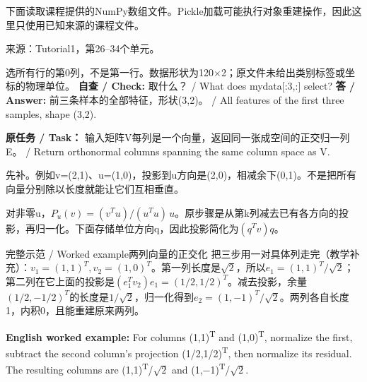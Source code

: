 下面读取课程提供的NumPy数组文件。Pickle加载可能执行对象重建操作，因此这里只使用已知来源的课程文件。


来源：Tutorial1，第26–34个单元。








选所有行的第0列，不是第一行。数据形状为120\ensuremath{\times}2；原文件未给出类别标签或坐标的物理单位。
\textbf{自查 / Check:} 取什么？ / What does mydata[:3,:] select?
\textbf{答 / Answer:} 前三条样本的全部特征，形状(3,2)。 / All features of the first three samples, shape (3,2).










\textbf{原任务 / Task：} 输入矩阵V每列是一个向量，返回同一张成空间的正交归一列E。 / Return orthonormal columns spanning the same column space as V.


先补。例如v=(2,1)、u=(1,0)，投影到u方向是(2,0)，相减余下(0,1)。不是把所有向量分别除以长度就能让它们互相垂直。


对非零u，\(P_u(v)=(v^Tu)/(u^Tu)\,u\)。原步骤是从第k列减去已有各方向的投影，再归一化。下面存储单位方向q，因此投影简化为\((q^Tv)q\)。

\begin{StudyBlock}{完整示范 / Worked example}{两列向量的正交化}
把三步用一对具体列走完（教学补充）：\(v_1=(1,1)^T,v_2=(1,0)^T\)。第一列长度是\(\sqrt2\)，所以\(e_1=(1,1)^T/\sqrt2\)；第二列在它上面的投影是\((e_1^Tv_2)e_1=(1/2,1/2)^T\)。减去投影，余量\((1/2,-1/2)^T\)的长度是\(1/\sqrt2\)，归一化得到\(e_2=(1,-1)^T/\sqrt2\)。两列各自长度1，内积0，且能重建原来两列。


\textbf{English worked example:} For columns (1,1)\textsuperscript{T} and (1,0)\textsuperscript{T}, normalize the first, subtract the second column's projection (1/2,1/2)\textsuperscript{T}, then normalize its residual. The resulting columns are (1,1)\textsuperscript{T}/\(\sqrt{2}\) and (1,\ensuremath{-}1)\textsuperscript{T}/\(\sqrt{2}\).
\end{StudyBlock}

